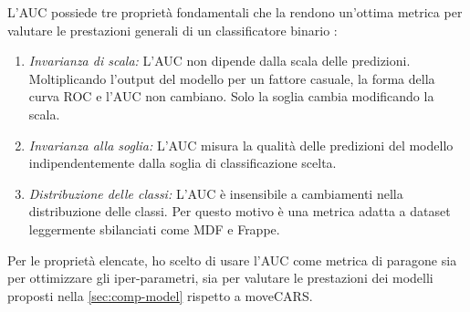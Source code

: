 \documentclass[12pt,italian]{report}
\begin{document}
L'AUC possiede tre proprietà fondamentali che la rendono un'ottima metrica per valutare le prestazioni generali di un classificatore binario \cite{auc-invariance}:

\begin{enumerate}
\item \textit{Invarianza di scala:} L'AUC non dipende dalla scala delle predizioni. Moltiplicando l'output del modello per un fattore casuale, la forma della curva ROC e l'AUC non cambiano. Solo la soglia cambia modificando la scala.

\item \textit{Invarianza alla soglia:} L'AUC misura la qualità delle predizioni del modello indipendentemente dalla soglia di classificazione scelta.

\item \textit{Distribuzione delle classi:} L'AUC è insensibile a cambiamenti nella distribuzione delle classi. Per questo motivo è una metrica adatta a dataset leggermente sbilanciati come MDF e Frappe.
\end{enumerate}

\noindent Per le proprietà elencate, ho scelto di usare l'AUC come metrica di paragone sia per ottimizzare gli iper-parametri, sia per valutare le prestazioni dei modelli proposti nella \autoref{sec:comp-model} rispetto a moveCARS.
\end{document}
